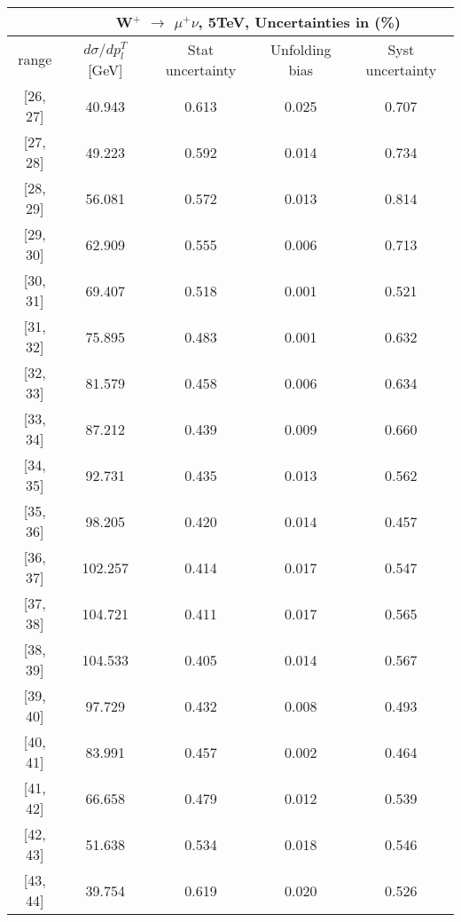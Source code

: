 \documentclass[12pt]{article}
\begin{document}
 
\begin{table}[] 
\begin{tabular}{c|c|c|c|c|}
\cline{2-5}
& \multicolumn{4}{c|}{W$^{+}$ $\rightarrow$ $\mu^{+} \nu $, 5TeV, Uncertainties in (\%)}  \\ \hline \hline 
\multicolumn{1}{|c|}{  range } & $d\sigma$/$dp^{T}_{l}$ [GeV]     & Stat uncertainty     & Unfolding bias     & Syst uncertainty        \\ \hline \hline 
\multicolumn{1}{|c|}{{[}26,  27{]}}  & 40.943 & 0.613 & 0.025 & 0.707 \\ \hline 
\multicolumn{1}{|c|}{{[}27,  28{]}}  & 49.223 & 0.592 & 0.014 & 0.734 \\ \hline 
\multicolumn{1}{|c|}{{[}28,  29{]}}  & 56.081 & 0.572 & 0.013 & 0.814 \\ \hline 
\multicolumn{1}{|c|}{{[}29,  30{]}}  & 62.909 & 0.555 & 0.006 & 0.713 \\ \hline 
\multicolumn{1}{|c|}{{[}30,  31{]}}  & 69.407 & 0.518 & 0.001 & 0.521 \\ \hline 
\multicolumn{1}{|c|}{{[}31,  32{]}}  & 75.895 & 0.483 & 0.001 & 0.632 \\ \hline 
\multicolumn{1}{|c|}{{[}32,  33{]}}  & 81.579 & 0.458 & 0.006 & 0.634 \\ \hline 
\multicolumn{1}{|c|}{{[}33,  34{]}}  & 87.212 & 0.439 & 0.009 & 0.660 \\ \hline 
\multicolumn{1}{|c|}{{[}34,  35{]}}  & 92.731 & 0.435 & 0.013 & 0.562 \\ \hline 
\multicolumn{1}{|c|}{{[}35,  36{]}}  & 98.205 & 0.420 & 0.014 & 0.457 \\ \hline 
\multicolumn{1}{|c|}{{[}36,  37{]}}  & 102.257 & 0.414 & 0.017 & 0.547 \\ \hline 
\multicolumn{1}{|c|}{{[}37,  38{]}}  & 104.721 & 0.411 & 0.017 & 0.565 \\ \hline 
\multicolumn{1}{|c|}{{[}38,  39{]}}  & 104.533 & 0.405 & 0.014 & 0.567 \\ \hline 
\multicolumn{1}{|c|}{{[}39,  40{]}}  & 97.729 & 0.432 & 0.008 & 0.493 \\ \hline 
\multicolumn{1}{|c|}{{[}40,  41{]}}  & 83.991 & 0.457 & 0.002 & 0.464 \\ \hline 
\multicolumn{1}{|c|}{{[}41,  42{]}}  & 66.658 & 0.479 & 0.012 & 0.539 \\ \hline 
\multicolumn{1}{|c|}{{[}42,  43{]}}  & 51.638 & 0.534 & 0.018 & 0.546 \\ \hline 
\multicolumn{1}{|c|}{{[}43,  44{]}}  & 39.754 & 0.619 & 0.020 & 0.526 \\ \hline 

\end{tabular}
\end{table}
\end{document}
